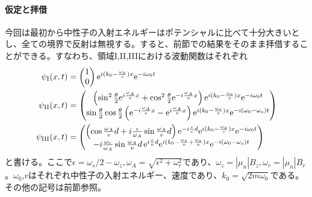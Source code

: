 \paragraph{仮定と拝借}
今回は最初から中性子の入射エネルギーはポテンシャルに比べて十分大きいとし、全ての境界で反射は無視する。すると、前節での結果をそのまま拝借することができる。すなわち、領域I,II,IIIにおける波動関数はそれぞれ
\begin{align}
\psi_\mathrm{I}(x,t)&=\begin{pmatrix} 1\\0\end{pmatrix} \mathrm{e}^{i (k_0-\frac{\omega_z}{v})x}\mathrm{e}^{-i\omega_0t}\\
\psi_\mathrm{II}(x,t)&=\begin{pmatrix} \left(\sin^2 \frac{\theta}{2} \mathrm{e}^{i\frac{\omega_A}{v}x} +\cos^2 \frac{\theta}{2} \mathrm{e}^{-i\frac{\omega_A}{v}x} \right) \mathrm{e}^{i(k_0-\frac{\omega_s}{v}) x} \mathrm{e}^{-i\omega_0 t} \\ \sin\frac{\theta}{2}\cos\frac{\theta}{2} \left(\mathrm{e}^{-i\frac{\omega_A}{v}x}-\mathrm{e}^{i\frac{\omega_A}{v}x}\right) \mathrm{e}^{i(k_0-\frac{\omega_s}{v}) x} \mathrm{e}^{-i(\omega_0-\omega_s) t}\end{pmatrix}\\
\psi_\mathrm{III}(x,t)&=\begin{pmatrix} \left(\cos \frac{\omega_A}{v}d +i\frac{\epsilon}{\omega_A} \sin \frac{\omega_A}{v}d\right) \mathrm{e}^{-i\frac{\epsilon}{v} d} \mathrm{e}^{i(k_0-\frac{\omega_z}{v})x}\mathrm{e}^{-i\omega_0t} \\ -i \frac{\omega_r}{\omega_A} \sin \frac{\omega_A}{v}d  \, \mathrm{e}^{i\frac{\epsilon}{v}d} \mathrm{e}^{i(k_0-\frac{\omega_s}{v}+\frac{\omega_z}{v})x}\mathrm{e}^{-i(\omega_0-\omega_s)t} \end{pmatrix}
\end{align}
と書ける。ここで$\epsilon=\omega_s/2-\omega_z,\omega_A=\sqrt{\epsilon^2+\omega_r^2}$であり、$\omega_z=|\mu_n|B_z,\omega_r=|\mu_n|B_r$。$\omega_0$,$v$はそれぞれ中性子の入射エネルギー、速度であり、$k_0=\sqrt{2m\omega_0}$である。その他の記号は前節参照。

